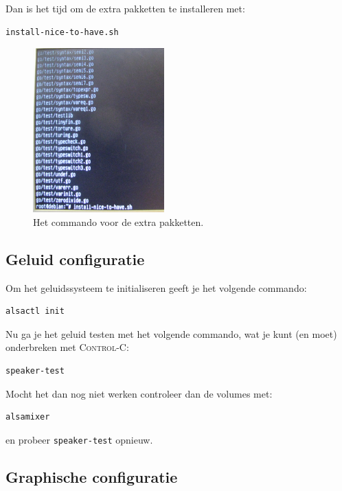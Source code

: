 \documentclass[12pt,a4paper]{article}
\begin{document}
Dan is het tijd om de extra pakketten te installeren met:
\begin{lstlisting}[language=bash]
install-nice-to-have.sh
\end{lstlisting}

\begin{figure}[H]
\centering
\includegraphics[width=0.45\textwidth]{install-nice-to-have-scherm}
\caption{Het commando voor de extra pakketten.}
\label{fig:nicetohave}
\end{figure}

\subsection{Geluid configuratie}

Om het geluidssysteem te initialiseren geeft je het volgende commando:

\begin{lstlisting}[language=bash]
alsactl init
\end{lstlisting}

Nu ga je het geluid testen met het volgende commando, wat je kunt (en moet) onderbreken met \textsc{Control-C}:

\begin{lstlisting}[language=bash]
speaker-test
\end{lstlisting}

Mocht het dan nog niet werken controleer dan de volumes met:

\begin{lstlisting}[language=bash]
alsamixer
\end{lstlisting}

en probeer \texttt{speaker-test} opnieuw.


\subsection{Graphische configuratie}
\end{document}
